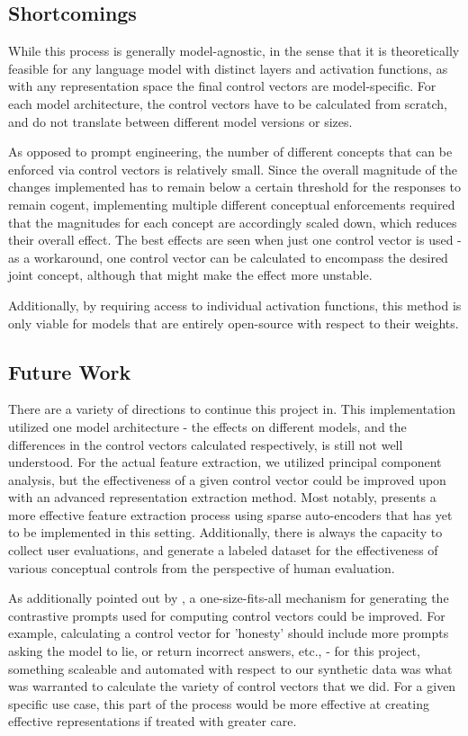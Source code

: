 \documentclass[11pt,a4paper]{article}
\begin{document}
\subsection{Shortcomings}
While this process is generally model-agnostic, in the sense that it is theoretically feasible for any language model with distinct layers and activation functions, as with any representation space the final control vectors are model-specific. For each model architecture, the control vectors have to be calculated from scratch, and do not translate between different model versions or sizes. 

As opposed to prompt engineering, the number of different concepts that can be enforced via control vectors is relatively small. Since the overall magnitude of the changes implemented has to remain below a certain threshold for the responses to remain cogent, implementing multiple different conceptual enforcements required that the magnitudes for each concept are accordingly scaled down, which reduces their overall effect. The best effects are seen when just one control vector is used - as a workaround, one control vector can be calculated to encompass the desired joint concept, although that might make the effect more unstable.

Additionally, by requiring access to individual activation functions, this method is only viable for models that are entirely open-source with respect to their weights. 

\subsection{Future Work}
There are a variety of directions to continue this project in. This implementation utilized one model architecture - the effects on different models, and the differences in the control vectors calculated respectively, is still not well understood. For the actual feature extraction, we utilized principal component analysis, but the effectiveness of a given control vector could be improved upon with an advanced representation extraction method. Most notably, \cite{bricken2023towards} presents a more effective feature extraction process using sparse auto-encoders that has yet to be implemented in this setting. Additionally, there is always the capacity to collect user evaluations, and generate a labeled dataset for the effectiveness of various conceptual controls from the perspective of human evaluation. 

As additionally pointed out by \cite{vogel2024repeng}, a one-size-fits-all mechanism for generating the contrastive prompts used for computing control vectors could be improved. For example, calculating a control vector for 'honesty' should include more prompts asking the model to lie, or return incorrect answers, etc., - for this project, something scaleable and automated with respect to our synthetic data was what was warranted to calculate the variety of control vectors that we did. For a given specific use case, this part of the process would be more effective at creating effective representations if treated with greater care.
\end{document}
